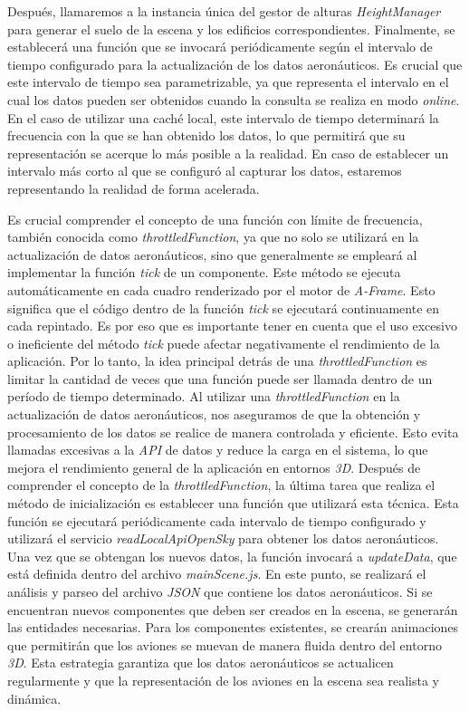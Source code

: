 \documentclass[a4paper, 11pt]{book}
\begin{document}
Después, llamaremos a la instancia única del gestor de alturas \emph{HeightManager} para generar el suelo de la escena y los edificios correspondientes.
Finalmente, se establecerá una función que se invocará periódicamente según el intervalo de tiempo configurado para la actualización de los datos aeronáuticos. Es crucial que este intervalo de tiempo sea parametrizable, ya que representa el intervalo en el cual los datos pueden ser obtenidos cuando la consulta se realiza en modo \emph{online}. En el caso de utilizar una caché local, este intervalo de tiempo determinará la frecuencia con la que se han obtenido los datos, lo que permitirá que su representación se acerque lo más posible a la realidad. En caso de establecer un intervalo más corto al que se configuró al capturar los datos, estaremos representando la realidad de forma acelerada.

Es crucial comprender el concepto de una función con límite de frecuencia, también conocida como \emph{throttledFunction}, ya que no solo se utilizará en la actualización de datos aeronáuticos, sino que generalmente se empleará al implementar la función \emph{tick} de un componente. Este método se ejecuta automáticamente en cada cuadro renderizado por el motor de \emph{A-Frame}. Esto significa que el código dentro de la función \emph{tick} se ejecutará continuamente en cada repintado.
Es por eso que es importante tener en cuenta que el uso excesivo o ineficiente del método \emph{tick} puede afectar negativamente el rendimiento de la aplicación. 
Por lo tanto, la idea principal detrás de una \emph{throttledFunction} es limitar la cantidad de veces que una función puede ser llamada dentro de un período de tiempo determinado.
Al utilizar una \emph{throttledFunction} en la actualización de datos aeronáuticos, nos aseguramos de que la obtención y procesamiento de los datos se realice de manera controlada y eficiente. Esto evita llamadas excesivas a la \emph{\gls{API}} de datos y reduce la carga en el sistema, lo que mejora el rendimiento general de la aplicación en entornos \emph{3D}.
Después de comprender el concepto de la \emph{throttledFunction}, la última tarea que realiza el método de inicialización es establecer una función que utilizará esta técnica. Esta función se ejecutará periódicamente cada intervalo de tiempo configurado y utilizará el servicio \emph{readLocalApiOpenSky} para obtener los datos aeronáuticos.
Una vez que se obtengan los nuevos datos, la función invocará a \emph{updateData}, que está definida dentro del archivo \emph{mainScene.js}. En este punto, se realizará el análisis y parseo del archivo \emph{\gls{JSON}} que contiene los datos aeronáuticos. Si se encuentran nuevos componentes que deben ser creados en la escena, se generarán las entidades necesarias. Para los componentes existentes, se crearán animaciones que permitirán que los aviones se muevan de manera fluida dentro del entorno \emph{3D}.
Esta estrategia garantiza que los datos aeronáuticos se actualicen regularmente y que la representación de los aviones en la escena sea realista y dinámica.
\end{document}
